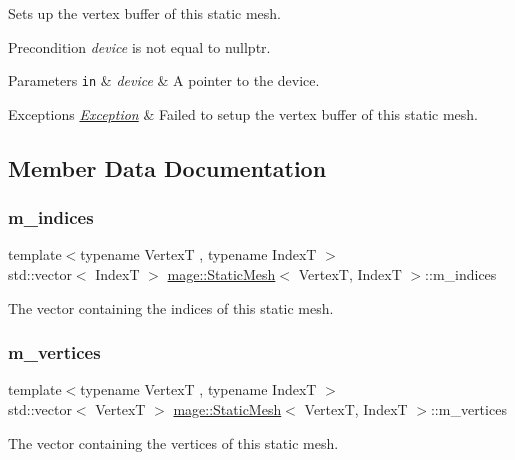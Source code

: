 Sets up the vertex buffer of this static mesh.

\begin{DoxyPrecond}{Precondition}
{\itshape device} is not equal to {\ttfamily nullptr}. 
\end{DoxyPrecond}

\begin{DoxyParams}[1]{Parameters}
\mbox{\tt in}  & {\em device} & A pointer to the device. \\
\hline
\end{DoxyParams}

\begin{DoxyExceptions}{Exceptions}
{\em \hyperlink{classmage_1_1_exception}{Exception}} & Failed to setup the vertex buffer of this static mesh. \\
\hline
\end{DoxyExceptions}


\subsection{Member Data Documentation}
\hypertarget{classmage_1_1_static_mesh_abc6b5fb8eaaf9e597ba6efe48f9e779e}{}\label{classmage_1_1_static_mesh_abc6b5fb8eaaf9e597ba6efe48f9e779e} 
\subsubsection{\texorpdfstring{m\+\_\+indices}{m\_indices}}
{\footnotesize\ttfamily template$<$typename VertexT , typename IndexT $>$ \\
std\+::vector$<$ IndexT $>$ \hyperlink{classmage_1_1_static_mesh}{mage\+::\+Static\+Mesh}$<$ VertexT, IndexT $>$\+::m\+\_\+indices\hspace{0.3cm}{\ttfamily [private]}}

The vector containing the indices of this static mesh. \hypertarget{classmage_1_1_static_mesh_a2e4bad427bfd2ff874dcff776cc4dc51}{}\label{classmage_1_1_static_mesh_a2e4bad427bfd2ff874dcff776cc4dc51} 
\subsubsection{\texorpdfstring{m\+\_\+vertices}{m\_vertices}}
{\footnotesize\ttfamily template$<$typename VertexT , typename IndexT $>$ \\
std\+::vector$<$ VertexT $>$ \hyperlink{classmage_1_1_static_mesh}{mage\+::\+Static\+Mesh}$<$ VertexT, IndexT $>$\+::m\+\_\+vertices\hspace{0.3cm}{\ttfamily [private]}}

The vector containing the vertices of this static mesh. 